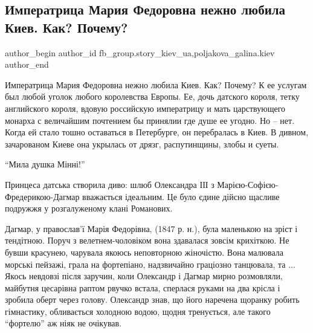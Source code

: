  
 
 
 
 
 
\subsection{Императрица Мария Федоровна нежно любила Киев. Как? Почему?}
\label{sec:24_12_2021.fb.fb_group.story_kiev_ua.1.imperatrica_maria_fedorovna}
 
\ifcmt
 author_begin
   author_id fb_group.story_kiev_ua,poljakova_galina.kiev
 author_end
\fi

Императрица Мария Федоровна нежно любила Киев. Как? Почему? К ее услугам был
любой уголок любого королевства Европы. Ее, дочь датского короля, тетку
английского короля, вдовую российскую императрицу и мать царствующего монарха с
величайшим почтением бы принялии где душе ее угодно. Но – нет. Когда ей стало
тошно оставаться в Петербурге, он перебралась в Киев. В дивном, зачарованом
Киеве она укрылась от дрязг, распутинщины, злобы и суеты.

\enquote{Мила душка Мінні!}

Принцеса датська створила диво: шлюб Олександра ІІІ з
Марією-Софією-Фредерикою-Дагмар вважається ідеальним. Це було єдине дійсно
щасливе подружжя у розгалуженому клані Романових. 


Дагмар, у православ’ї Марія Федорівна, (1847 р. н.), була маленькою на зріст і
тендітною. Поруч з велетнем-чоловіком вона здавалася зовсім крихіткою. Не бувши
красунею, чарувала якоюсь неповторною жіночістю. Вона малювала морські пейзажі,
грала на фортепіано, надзвичайно граціозно танцювала, та ... Якось невдовзі
після заручин, коли Олександр і Дагмар мирно розмовляли, майбутня цесарівна
раптом рвучко встала, сперлася руками на два крісла і зробила оберт через
голову. Олександр знав, що його наречена щоранку робить гімнастику, обливається
холодною водою, щодня тренується, але такого \enquote{фортелю} аж ніяк не очікував. 


